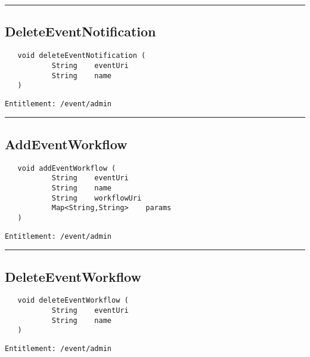 \rule{12cm}{2pt}
\subsection{DeleteEventNotification}
\label{Api:DeleteEventNotification}
\begin{Verbatim}
   void deleteEventNotification (
           String    eventUri
           String    name
   )
\end{Verbatim}
\begin{Verbatim}[formatcom=\color{Maroon}]
  Entitlement: /event/admin
\end{Verbatim}



\rule{12cm}{2pt}
\subsection{AddEventWorkflow}
\label{Api:AddEventWorkflow}
\begin{Verbatim}
   void addEventWorkflow (
           String    eventUri
           String    name
           String    workflowUri
           Map<String,String>    params
   )
\end{Verbatim}
\begin{Verbatim}[formatcom=\color{Maroon}]
  Entitlement: /event/admin
\end{Verbatim}



\rule{12cm}{2pt}
\subsection{DeleteEventWorkflow}
\label{Api:DeleteEventWorkflow}
\begin{Verbatim}
   void deleteEventWorkflow (
           String    eventUri
           String    name
   )
\end{Verbatim}
\begin{Verbatim}[formatcom=\color{Maroon}]
  Entitlement: /event/admin
\end{Verbatim}



